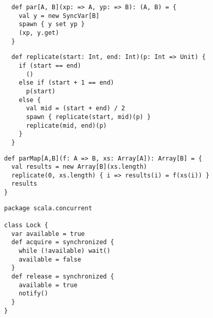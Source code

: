 \begin{itemize}


\begin{lstlisting}
  def par[A, B](xp: => A, yp: => B): (A, B) = {
    val y = new SyncVar[B]
    spawn { y set yp }
    (xp, y.get)
  }
\end{lstlisting}
\begin{lstlisting}
  def replicate(start: Int, end: Int)(p: Int => Unit) {
    if (start == end)
      ()
    else if (start + 1 == end)
      p(start)
    else {
      val mid = (start + end) / 2
      spawn { replicate(start, mid)(p) }
      replicate(mid, end)(p)
    }
  }
\end{lstlisting}


\begin{lstlisting}
def parMap[A,B](f: A => B, xs: Array[A]): Array[B] = {
  val results = new Array[B](xs.length)
  replicate(0, xs.length) { i => results(i) = f(xs(i)) }
  results
}
\end{lstlisting}



\begin{lstlisting}
package scala.concurrent

class Lock {
  var available = true
  def acquire = synchronized {
    while (!available) wait()
    available = false
  }
  def release = synchronized {
    available = true
    notify()
  }
}
\end{lstlisting}


\end{itemize}

